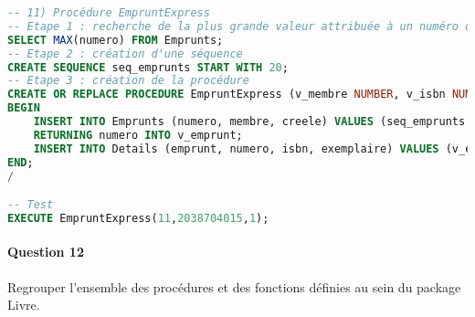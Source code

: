 \documentclass[10pt, oneside]{article}
\begin{document}
\begin{lstlisting}[language=sql, title=Question 11, label=QV11]
-- 11) Procédure EmpruntExpress
-- Etape 1 : recherche de la plus grande valeur attribuée à un numéro d'emprunt
SELECT MAX(numero) FROM Emprunts;
-- Etape 2 : création d'une séquence
CREATE SEQUENCE seq_emprunts START WITH 20;
-- Etape 3 : création de la procédure
CREATE OR REPLACE PROCEDURE EmpruntExpress (v_membre NUMBER, v_isbn NUMBER, v_exemplaire NUMBER) AS v_emprunt Emprunts.numero%TYPE;
BEGIN
	INSERT INTO Emprunts (numero, membre, creele) VALUES (seq_emprunts.nextval, v_membre, SYSDATE)
	RETURNING numero INTO v_emprunt;
	INSERT INTO Details (emprunt, numero, isbn, exemplaire) VALUES (v_emprunt, 1, v_isbn, v_exemplaire);
END;
/

-- Test
EXECUTE EmpruntExpress(11,2038704015,1);
\end{lstlisting}


\paragraph{Question 12} Regrouper l'ensemble des procédures et des fonctions définies au sein du package Livre.
\end{document}
